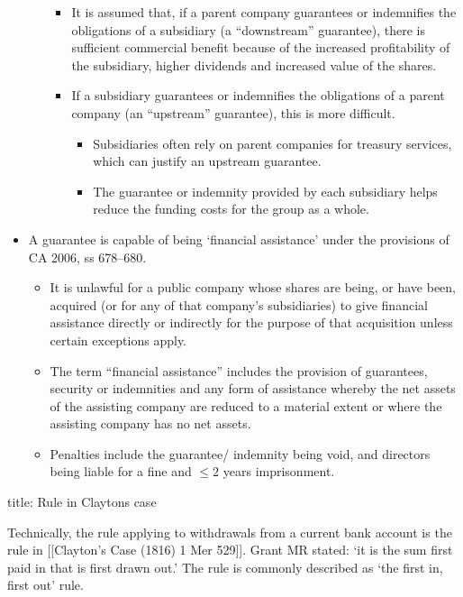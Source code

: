 \documentclass[
]{article}
\newenvironment{Shaded}{}{}
\newcommand{\NormalTok}[1]{#1}
\providecommand{\tightlist}{%
  \setlength{\itemsep}{0pt}\setlength{\parskip}{0pt}}
\begin{document}
\begin{itemize}
\begin{itemize}
    \begin{itemize}
    \tightlist
    \item
      It is assumed that, if a parent company guarantees or indemnifies
      the obligations of a subsidiary (a ``downstream'' guarantee),
      there is sufficient commercial benefit because of the increased
      profitability of the subsidiary, higher dividends and increased
      value of the shares.
    \item
      If a subsidiary guarantees or indemnifies the obligations of a
      parent company (an ``upstream'' guarantee), this is more
      difficult.

      \begin{itemize}
      \tightlist
      \item
        Subsidiaries often rely on parent companies for treasury
        services, which can justify an upstream guarantee.
      \item
        The guarantee or indemnity provided by each subsidiary helps
        reduce the funding costs for the group as a whole.
      \end{itemize}
    \end{itemize}
  \end{itemize}
\item
  A guarantee is capable of being `financial assistance' under the
  provisions of CA 2006, ss 678--680.

  \begin{itemize}
  \tightlist
  \item
    It is unlawful for a public company whose shares are being, or have
    been, acquired (or for any of that company's subsidiaries) to give
    financial assistance directly or indirectly for the purpose of that
    acquisition unless certain exceptions apply.
  \item
    The term ``financial assistance'' includes the provision of
    guarantees, security or indemnities and any form of assistance
    whereby the net assets of the assisting company are reduced to a
    material extent or where the assisting company has no net assets.
  \item
    Penalties include the guarantee/ indemnity being void, and directors
    being liable for a fine and \(\leq 2\) years imprisonment.
  \end{itemize}
\end{itemize}

\begin{Shaded}
\begin{Highlighting}[]
\NormalTok{title: Rule in Clayton\textquotesingle{}s case}

\NormalTok{Technically, the rule applying to withdrawals from a current bank account is the rule in [[Clayton’s Case (1816) 1 Mer 529]]. Grant MR stated: ‘it is the sum first paid in that is first drawn out.’ The rule is commonly described as ‘the first in, first out’ rule.}
\end{Highlighting}
\end{Shaded}
\end{document}
